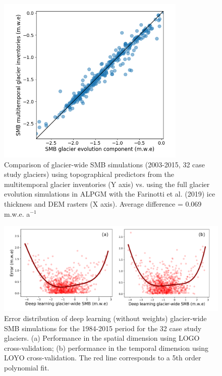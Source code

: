 \begin{figure}[h]
\centering
\includegraphics[width=9cm]{Figures/methods/Figure_S5.png}
\caption{Comparison of glacier-wide SMB simulations (2003-2015, 32 case study glaciers) using topographical predictors from the multitemporal glacier inventories (Y axis) vs. using the full glacier evolution simulations in ALPGM with the Farinotti et al. (2019) ice thickness and DEM rasters (X axis). Average difference = 0.069 m.w.e.  a$^{-1}$}
\label{methods:figS5}
\end{figure}

\begin{figure}[h]
\centering
\includegraphics[width=15cm]{Figures/methods/Figure_S6.png}
\caption{Error distribution of deep learning (without weights) glacier-wide SMB simulations for the 1984-2015 period for the 32 case study glaciers. (a) Performance in the spatial dimension using LOGO cross-validation; (b) performance in the temporal dimension using LOYO cross-validation. The red line corresponds to a 5th order polynomial fit.}
\label{methods:figS6}
\end{figure}
 


